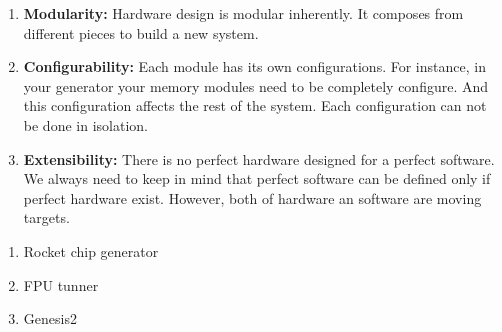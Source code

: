 \begin{enumerate}
    \item \textbf{Modularity:} Hardware design is modular inherently. It composes from different pieces to build a new system.
    \item \textbf{Configurability:} Each module has its own configurations. For instance, in your generator your memory modules need to be completely configure. And this configuration affects the rest of the system. Each configuration can not be done in isolation.
    \item \textbf{Extensibility:} There is no perfect hardware designed for a perfect software. We always need to keep in mind that perfect software can be defined only if perfect hardware exist. However, both of hardware an software are moving targets.
\end{enumerate}


\begin{enumerate}
    \item Rocket chip generator
    \item FPU tunner
    \item Genesis2
\end{enumerate}

